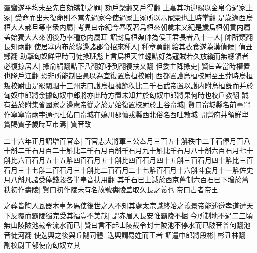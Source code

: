 羣蠻遂平均未至先自劾矯制之罪|{
	劾戶槩翻又戶得翻}
上嘉其功迎賜以金帛令過家上冢|{
	受命而出未復命則不當先過家今使過家上冢所以示寵榮也上時掌翻}
是歲遼西烏桓大人郝旦等率衆内屬|{
	考異曰帝紀今春旣著烏桓來朝歲末又紀是歲烏桓朝貢内屬盖始獨大人來朝後乃率種族内屬耳}
詔封烏桓渠帥為侯王君長者八十一人|{
	帥所類翻長知兩翻}
使居塞内布於緣邊諸郡令招來種人|{
	種章勇翻}
給其衣食遂為漢偵候|{
	偵丑鄭翻}
助撃匈奴鮮卑時司徒掾班彪上言烏桓天性輕黠好為寇賊若久放縱而無總領者必復掠居人|{
	掾俞絹翻黠下八翻好呼到翻復扶又翻}
但委主降掾吏|{
	賢曰盖當時權置也降戶江翻}
恐非所能制臣愚以為宜復置烏桓校尉|{
	西都置護烏桓校尉至王莽時烏桓叛校尉由是罷闞駰十三州志曰護烏桓擁節秩比二千石武帝置以護内附烏桓旣而并於匈奴中郎將余據匈奴中郎將亦此時方置未知并於匈奴中郎將果何時也校戶教翻}
誠有益於附集省國家之邊慮帝從之於是始復置校尉於上谷甯城|{
	賢曰甯城縣名前書甯作寧寧甯兩字通也杜佑曰甯城在媯川郡懷戎縣西北俗名西吐㪍城}
開營府并領鮮卑賞賜質子歲時互市焉|{
	質音致}


二十六年正月詔增百官奉|{
	百官志大將軍三公奉月三百五十斛秩中二千石俸月百八十斛二千石月百二十斛比二千石月百斛千石月九十斛比千石月八十斛六百石月七十斛比六百石月五十五斛四百石月五十斛比四百石月四十五斛三百石月四十斛比三百石月三十七斛二百石月三十斛比二百石月二十七斛百石月十六斛斗食月十一斛佐史月八斛凡諸受俸錢穀各半奉音扶用翻}
其千石已上減於西京舊制六百石已下增於舊秩初作夀陵|{
	賢曰初作陵未有名故號夀陵盖取久長之義也}
帝曰古者帝王

之葬皆陶人瓦器木車茅馬使後世之人不知其處太宗識終始之義景帝能述遵孝道遭天下反覆而霸陵獨完受其福豈不美哉|{
	謂赤眉入長安惟霸陵不掘}
今所制地不過二三頃無山陵陂池裁令流水而已|{
	賢曰言不起山陵裁令封土陂池不停水而已陂音普何翻池音徒河翻}
使迭興之後與丘隴同體|{
	迭興謂易姓而王者}
詔遣中郎將段彬|{
	彬丑林翻}
副校尉王郁使南匈奴立其

